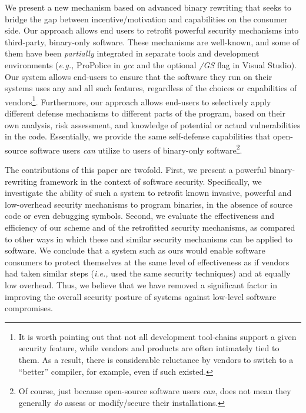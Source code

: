 
We present a new mechanism based on advanced binary rewriting that
seeks to bridge the gap between incentive/motivation and capabilities
on the consumer side. Our approach allows end users to retrofit
powerful security mechanisms into third-party, binary-only
software. These mechanisms are well-known, and some of them have been
{\it partially} integrated in separate tools and development
environments ({\it e.g.,} ProPolice in {\it gcc} and the optional {\it
  /GS} flag in Visual Studio). Our system allows end-users to ensure
that the software they run on their systems uses any and all such
features, regardless of the choices or capabilities of
vendors\footnote{It is worth pointing out that not all development
  tool-chains support a given security feature, while vendors and
  products are often intimately tied to them. As a result, there is
  considerable reluctance by vendors to switch to a ``better''
  compiler, for example, even if such existed.}. Furthermore, our
approach allows end-users to selectively apply different defense
mechanisms to different parts of the program, based on their own
analysis, risk assessment, and knowledge of potential or actual
vulnerabilities in the code. Essentially, we provide the same
self-defense capabilities that open-source software users {\it can}
utilize to users of binary-only software\footnote{Of course, just
  because open-source software users {\it can}, does not mean they
  generally {\it do} assess or modify/secure their installations.}.

The contributions of this paper are twofold. First, we present a
powerful binary-rewriting framework in the context of software
security. Specifically, we investigate the ability of such a system to
retrofit known invasive, powerful and low-overhead security mechanisms
to program binaries, in the absence of source code or even debugging
symbols. Second, we evaluate the effectiveness and efficiency of our
scheme and of the retrofitted security mechanisms, as compared to
other ways in which these and similar security mechanisms can be
applied to software. We conclude that a system such as ours would
enable software consumers to protect themselves at the same level of
effectiveness as if vendors had taken similar steps ({\it i.e.,} used
the same security techniques) and at equally low overhead. Thus, we
believe that we have removed a significant factor in improving the
overall security posture of systems against low-level software
compromises.

